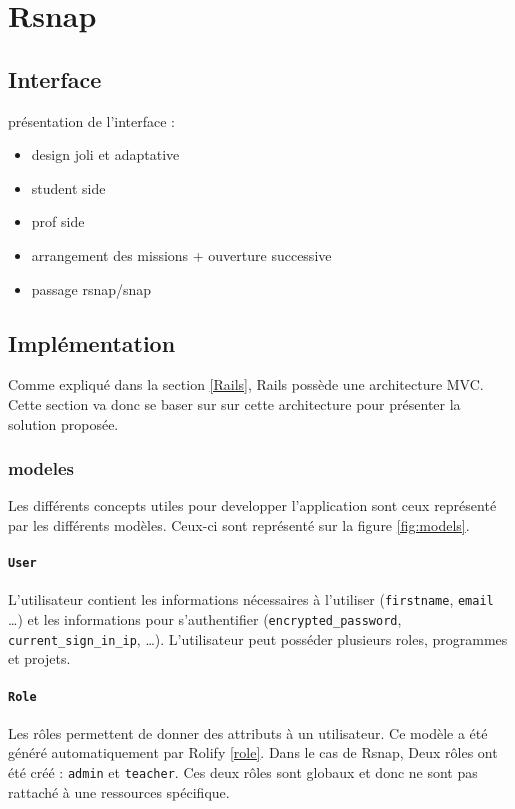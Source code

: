\section{Rsnap}
\graphicspath{{content/7-solution/3-rsnap/images/}}

\subsection{Interface}
présentation de l'interface :
\begin{itemize}
  \item design joli et adaptative
  \item student side
  \item prof side
  \item arrangement des missions + ouverture successive
  \item passage rsnap/snap
\end{itemize}

\subsection{Implémentation}
Comme expliqué dans la section \ref{Rails}, Rails possède une architecture MVC. Cette section va donc se baser sur sur cette architecture pour présenter la solution proposée.

\subsubsection{modeles}
Les différents concepts utiles pour developper l'application sont ceux représenté par les différents modèles. Ceux-ci sont représenté sur la figure \ref{fig:models}.
\paragraph{\texttt{User}} L'utilisateur contient les informations nécessaires à l'utiliser (\texttt{firstname}, \texttt{email} \ldots) et les informations pour s'authentifier (\texttt{encrypted\_password}, \texttt{current\_sign\_in\_ip}, \ldots). L'utilisateur peut posséder plusieurs roles, programmes et projets.
\paragraph{\texttt{Role}} Les rôles permettent de donner des attributs à un utilisateur. Ce modèle a été généré automatiquement par Rolify \ref{role}. Dans le cas de Rsnap, Deux rôles ont été créé : \texttt{admin} et \texttt{teacher}. Ces deux rôles sont globaux et donc ne sont pas rattaché à une ressources spécifique.%

